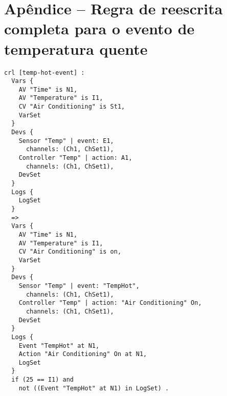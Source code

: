 \section{Apêndice -- Regra de reescrita completa para o evento de temperatura quente} \label{apx:apx2}
\begin{verbatim}
crl [temp-hot-event] :
  Vars {
    AV "Time" is N1,
    AV "Temperature" is I1,
    CV "Air Conditioning" is St1,
    VarSet
  }
  Devs {
    Sensor "Temp" | event: E1, 
      channels: (Ch1, ChSet1),
    Controller "Temp" | action: A1, 
      channels: (Ch1, ChSet1),
    DevSet
  }
  Logs {
    LogSet
  }
  =>
  Vars {
    AV "Time" is N1,
    AV "Temperature" is I1,
    CV "Air Conditioning" is on,
    VarSet
  }
  Devs {
    Sensor "Temp" | event: "TempHot", 
      channels: (Ch1, ChSet1),
    Controller "Temp" | action: "Air Conditioning" On,
      channels: (Ch1, ChSet1),
    DevSet
  }
  Logs {
    Event "TempHot" at N1,
    Action "Air Conditioning" On at N1,
    LogSet
  }
  if (25 == I1) and 
    not ((Event "TempHot" at N1) in LogSet) .
\end{verbatim}
